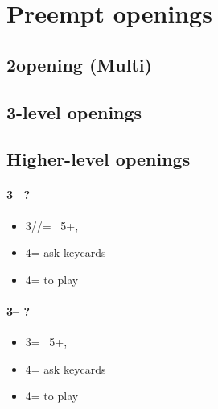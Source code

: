 \documentclass[12pt, a4paper]{report}
\begin{document}
{{        %
    }

    \chapter*{\colorbox{Plum!30}{Preempt openings}}
     {

    }

    \section*{\colorbox{blue!30}{2\diams opening (Multi)}}
     {

    }

    \section*{\colorbox{blue!30}{3-level openings}}
     {

    }

    \section*{\colorbox{blue!30}{Higher-level openings}}
     {
        \subsubsection*{3\clubs -- ?}
        \begin{itemize}
            \item 3\diams/\hearts/\spades = \nat\ 5+, \gf
            \item 4\diams = ask keycards
            \item 4\major = to play
        \end{itemize}

        \subsubsection*{3\diams -- ?}
        \begin{itemize}
            \item 3\major = \nat\ 5+, \gf
            \item 4\clubs = ask keycards
            \item 4\major = to play
        \end{itemize}

}}
\end{document}
